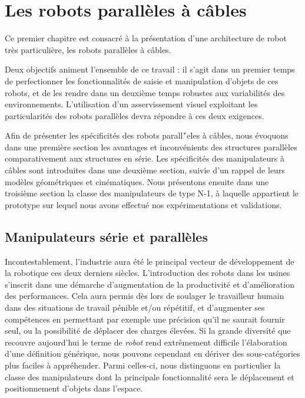 \chapter{Les robots parall\`eles \`a c\^ables} \label{chap0}

Ce premier chapitre est consacré à la présentation d'une architecture de robot 
très particulière, les robots parall\`eles \`a c\^ables.

Deux objectifs animent l'ensemble de ce travail : il s'agit dans un premier 
temps de perfectionner les fonctionnalités de saisie et manipulation d'objets de 
ces robots, et de les rendre dans un deuxi\`eme temps robustes aux 
variabilit\'es des environnements. L'utilisation d'un asservissement visuel 
exploitant les particularit\'es des robots parall\`eles devra r\'epondre \`a ces 
deux exigences.

Afin de pr\'esenter les sp\'ecificit\'es des robots parall\'`eles \`a c\^ables, 
nous  évoquons dans une première section les avantages et inconvénients des 
structures parallèles comparativement aux structures en série. Les spécificités 
des manipulateurs à c\^ables sont introduites dans une deuxième section, suivie 
d'un rappel de leurs modèles géométriques et cinématiques. Nous présentons 
ensuite dans une troisième section la classe des manipulateurs de type N-1, \`a 
laquelle appartient le prototype sur lequel nous avons effectu\'e nos 
expérimentations et validations.

\section{Manipulateurs série et parallèles} \label{chap0-0}

Incontestablement, l'industrie aura été le principal vecteur de développe\-ment 
de la robotique ces deux derniers siècles. L'introduction des robots dans les 
usines s'inscrit dans une démarche d'augmentation de la productivité et 
d'amélio\-ration des performances. Cela aura permis dès lors de soulager le 
travailleur humain dans des situations de travail pénible et/ou répétitif, et 
d'augmenter ses compétences en permettant par exemple une précision qu'il ne 
saurait fournir seul, ou la possibilité de déplacer des charges élevées. Si la 
grande diversité que recouvre aujourd'hui le terme de {\it robot} rend 
extrêmement difficile l'élaboration d'une définition générique, nous pouvons 
cependant en dériver des sous-catégories plus faciles à appréhender. Parmi 
celles-ci, nous distinguons en particulier la classe des manipulateurs dont 
la principale fonctionnalité sera le déplacement et positionnement d'objets 
dans l'espace.

